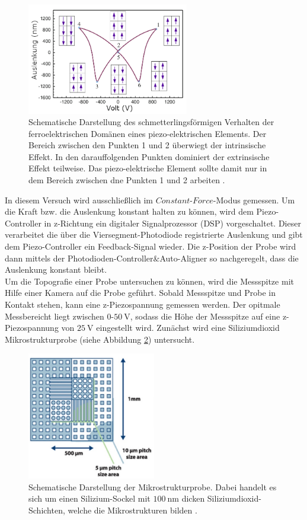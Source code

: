 \begin{figure}[H]
	\centering
	\includegraphics[width=0.63\textwidth]{Abb/butterfly.png}
	\caption{Schematische Darstellung des schmetterlingsförmigen Verhalten der
	ferroelektrischen Domänen eines piezo-elektrischen Elements. Der Bereich zwischen
	den Punkten 1 und 2 überwiegt	der intrinsische Effekt. In den darauffolgenden
	Punkten dominiert der extrinsische Effekt teilweise. Das piezo-elektrische
	Element sollte damit nur in dem Bereich zwischen dne Punkten 1 und 2 arbeiten
	\cite[47]{AFM}.}
	\label{fig:butterfly}
\end{figure}

\noindent
In diesem Versuch wird ausschließlich im $\textit{Constant-Force}$-Modus gemessen.
Um die Kraft bzw. die Auslenkung konstant halten zu können, wird dem Piezo-Controller
in z-Richtung ein digitaler Signalprozessor (DSP) vorgeschaltet. Dieser verarbeitet
die über die Viersegment-Photodiode registrierte Auslenkung und gibt dem Piezo-Controller
ein Feedback-Signal wieder. Die z-Position der Probe wird dann mittels der
Photodioden-Controller$\&$Auto-Aligner so nachgeregelt, dass die Auslenkung
konstant bleibt.\\
Um die Topografie einer Probe untersuchen zu können, wird die Messspitze mit Hilfe
einer Kamera auf die Probe geführt. Sobald Messspitze und Probe in Kontakt stehen,
kann eine z-Piezospannung gemessen werden. Der opitmale Messbereicht liegt
zwischen 0-$\SI{50}{\volt}$, sodass die Höhe der Messspitze auf eine
z-Piezospannung von $\SI{25}{\volt}$ eingestellt wird. Zunächst wird eine
Siliziumdioxid Mikrostrukturprobe (siehe Abbildung \ref{fig:MSP}) untersucht.

\begin{figure}[H]
	\centering
	\includegraphics[width=0.5\textwidth]{Abb/MSP.png}
	\caption{Schematische Darstellung der Mikrostrukturprobe. Dabei handelt es sich
	um einen Silizium-Sockel mit $\SI{100}{\nano\meter}$ dicken Siliziumdioxid-Schichten,
	welche die Mikrostrukturen bilden	\cite[4]{anleitung}.}
	\label{fig:MSP}
\end{figure}

